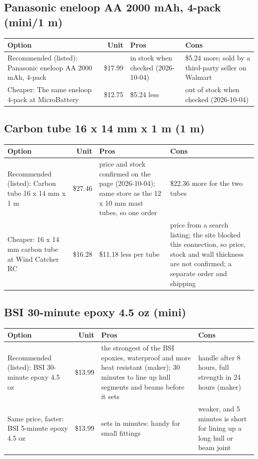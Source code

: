 \documentclass[11pt]{article}
\begin{document}
\subsection*{Panasonic eneloop AA 2000 mAh, 4-pack \normalfont\small (mini/1 m)}
{\small
\begin{longtable}{L{3.6cm}rL{5.4cm}L{5.4cm}}
\toprule
Option & Unit & Pros & Cons \\
\midrule
Recommended (listed): Panasonic eneloop AA 2000 mAh, 4-pack & \$17.99 & in stock when checked (2026-10-04) & \$5.24 more; sold by a third-party seller on Walmart \\
Cheaper: The same eneloop 4-pack at MicroBattery & \$12.75 & \$5.24 less & out of stock when checked (2026-10-04) \\
\bottomrule
\end{longtable}}
\subsection*{Carbon tube 16 x 14 mm x 1 m \normalfont\small (1 m)}
{\small
\begin{longtable}{L{3.6cm}rL{5.4cm}L{5.4cm}}
\toprule
Option & Unit & Pros & Cons \\
\midrule
Recommended (listed): Carbon tube 16 x 14 mm x 1 m & \$27.46 & price and stock confirmed on the page (2026-10-04); same store as the 12 x 10 mm mast tubes, so one order & \$22.36 more for the two tubes \\
Cheaper: 16 x 14 mm carbon tube at Wind Catcher RC & \$16.28 & \$11.18 less per tube & price from a search listing; the site blocked this connection, so price, stock and wall thickness are not confirmed; a separate order and shipping \\
\bottomrule
\end{longtable}}
\subsection*{BSI 30-minute epoxy 4.5 oz \normalfont\small (mini)}
{\small
\begin{longtable}{L{3.6cm}rL{5.4cm}L{5.4cm}}
\toprule
Option & Unit & Pros & Cons \\
\midrule
Recommended (listed): BSI 30-minute epoxy 4.5 oz & \$13.99 & the strongest of the BSI epoxies, waterproof and more heat resistant (maker); 30 minutes to line up hull segments and beams before it sets & handle after 8 hours, full strength in 24 hours (maker) \\
Same price, faster: BSI 5-minute epoxy 4.5 oz & \$13.99 & sets in minutes: handy for small fittings & weaker, and 5 minutes is short for lining up a long hull or beam joint \\
\bottomrule
\end{longtable}}
\end{document}
